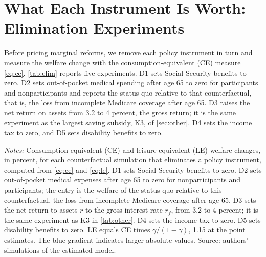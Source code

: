 \section{What Each Instrument Is Worth: Elimination Experiments}\label{sec:elimination}

Before pricing marginal reforms, we remove each policy instrument in turn and measure the welfare change with the consumption-equivalent (CE) measure \eqref{eq:ce}. \autoref{tab:elim} reports five experiments. D1 sets Social Security benefits to zero. D2 sets out-of-pocket medical spending after age 65 to zero for participants and nonparticipants and reports the status quo relative to that counterfactual, that is, the loss from incomplete Medicare coverage after age 65. D3 raises the net return on assets from 3.2 to 4 percent, the gross return; it is the same experiment as the largest saving subsidy, K3, of \autoref{sec:other}. %
D4 sets the income tax to zero, and D5 sets disability benefits to zero. %

\begin{table}[!t]
\centering
\caption{Welfare Changes from Eliminating Each Policy Instrument}
\label{tab:elim}
\vspace{6pt}
\footnotesize
\begin{threeparttable}

\begin{tablenotes}[flushleft]\scriptsize
\item[] \textit{Notes:} Consumption-equivalent (CE) and leisure-equivalent (LE) welfare changes, in percent, for each counterfactual simulation that eliminates a policy instrument, computed from \eqref{eq:ce} and \eqref{eq:le}. D1 sets Social Security benefits to zero. D2 sets out-of-pocket medical expenses after age 65 to zero for nonparticipants and participants; the entry is the welfare of the status quo relative to this counterfactual, the loss from incomplete Medicare coverage after age 65. D3 sets the net return to assets $r$ to the gross interest rate $r_f$, from 3.2 to 4 percent; it is the same experiment as K3 in \autoref{tab:other}. D4 sets the income tax to zero. D5 sets disability benefits to zero. LE equals CE times $\gamma/(1-\gamma)$, 1.15 at the point estimates. The blue gradient indicates larger absolute values. Source: authors' simulations of the estimated model.
\end{tablenotes}
\end{threeparttable}
\end{table}

